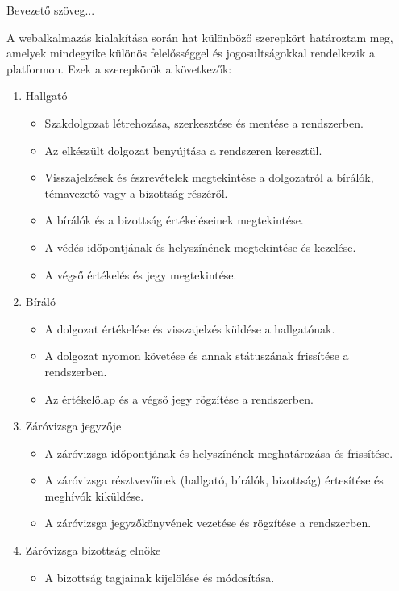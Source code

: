 
Bevezető szöveg...


A webalkalmazás kialakítása során hat különböző szerepkört határoztam meg, amelyek mindegyike különös felelősséggel és jogosultságokkal rendelkezik a platformon. Ezek a szerepkörök a következők:

\begin{enumerate}
\item Hallgató
\begin{itemize}
\item Szakdolgozat létrehozása, szerkesztése és mentése a rendszerben.
\item Az elkészült dolgozat benyújtása a rendszeren keresztül.
\item Visszajelzések és észrevételek megtekintése a dolgozatról a bírálók, témavezető vagy a bizottság részéről.
\item A bírálók és a bizottság értékeléseinek megtekintése.
\item A védés időpontjának és helyszínének megtekintése és kezelése.
\item A végső értékelés és jegy megtekintése.
\end{itemize}

\item Bíráló
\begin{itemize}
\item A dolgozat értékelése és visszajelzés küldése a hallgatónak.
\item A dolgozat nyomon követése és annak státuszának frissítése a rendszerben.
\item Az értékelőlap és a végső jegy rögzítése a rendszerben.
\end{itemize}

\item Záróvizsga jegyzője
\begin{itemize}
\item A záróvizsga időpontjának és helyszínének meghatározása és frissítése.
\item A záróvizsga résztvevőinek (hallgató, bírálók, bizottság) értesítése és meghívók kiküldése.
\item A záróvizsga jegyzőkönyvének vezetése és rögzítése a rendszerben.
\end{itemize}

\newpage
\item Záróvizsga bizottság elnöke
\begin{itemize}
\item A bizottság tagjainak kijelölése és módosítása.


\end{itemize}
\end{enumerate}
